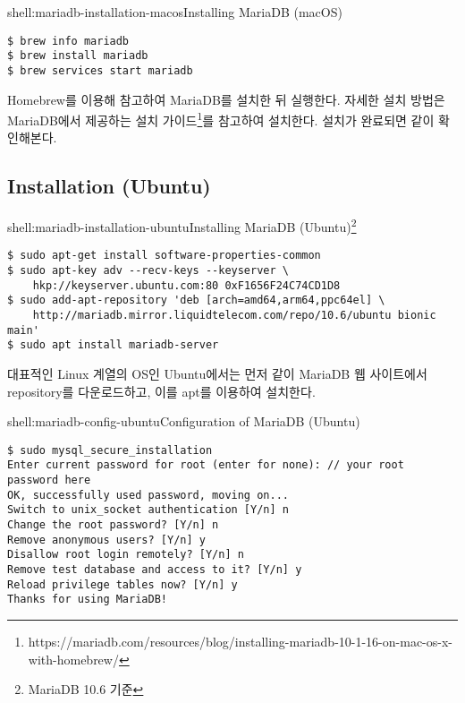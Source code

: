 \begin{shellenv}{shell:mariadb-installation-macos}{Installing MariaDB (macOS)}\begin{verbatim}
$ brew info mariadb
$ brew install mariadb
$ brew services start mariadb
\end{verbatim}
\end{shellenv}

Homebrew를 이용해 \를 참고하여 MariaDB를 설치한 뒤 실행한다. 자세한 설치 방법은 MariaDB에서 제공하는 설치 가이드\footnote{https://mariadb.com/resources/blog/installing-mariadb-10-1-16-on-mac-os-x-with-homebrew/}를 참고하여 설치한다. 설치가 완료되면 \와 같이 확인해본다.

\subsection*{Installation (Ubuntu)}

\begin{shellenv}{shell:mariadb-installation-ubuntu}{Installing MariaDB (Ubuntu)\footnote{MariaDB 10.6 기준}}\begin{verbatim}
$ sudo apt-get install software-properties-common
$ sudo apt-key adv --recv-keys --keyserver \
    hkp://keyserver.ubuntu.com:80 0xF1656F24C74CD1D8
$ sudo add-apt-repository 'deb [arch=amd64,arm64,ppc64el] \
    http://mariadb.mirror.liquidtelecom.com/repo/10.6/ubuntu bionic main'
$ sudo apt install mariadb-server
\end{verbatim}
\end{shellenv}

대표적인 Linux 계열의 OS인 Ubuntu에서는 먼저 \와 같이 MariaDB 웹 사이트에서 repository를 다운로드하고, 이를 apt를 이용하여 설치한다.

\begin{shellenv}{shell:mariadb-config-ubuntu}{Configuration of MariaDB (Ubuntu)}\begin{verbatim}
$ sudo mysql_secure_installation
Enter current password for root (enter for none): // your root password here
OK, successfully used password, moving on...
Switch to unix_socket authentication [Y/n] n
Change the root password? [Y/n] n
Remove anonymous users? [Y/n] y
Disallow root login remotely? [Y/n] n
Remove test database and access to it? [Y/n] y
Reload privilege tables now? [Y/n] y
Thanks for using MariaDB!
\end{verbatim}
\end{shellenv}

